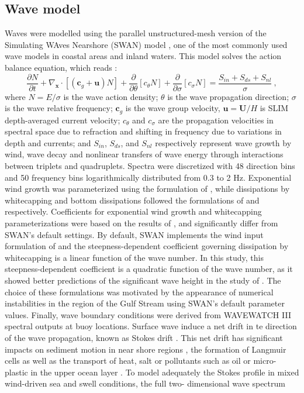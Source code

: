 \documentclass[11pt,a4paper]{article}
\begin{document}
\subsection{Wave model}
Waves were modelled using the parallel unstructured-mesh version of the Simulating WAves Nearshore (SWAN) model \citep{booij1999third}, one of the most commonly used wave models in coastal areas and inland waters. This model solves the action balance equation, which reads \citep{mei1989applied}:
\begin{equation}
    \dfrac{\partial N}{\partial t} + \nabla_\mathbf{x}\cdot[(\mathbf{c}_g+\mathbf{u})N] + \dfrac{\partial }{\partial \theta}[c_\theta N] + \dfrac{\partial}{\partial \sigma}[c_\sigma N] = \dfrac{S_{in}+S_{ds}+S_{nl}}{\sigma}~, \label{eq:swan}
\end{equation}
where $N=E/\sigma$ is the wave action density; $\theta$ is the wave propagation direction; $\sigma$ is the wave relative frequency; $\mathbf{c}_g$ is the wave group velocity, $\mathbf{u}=\mathbf{U}/H$ is SLIM depth-averaged current velocity; $c_\theta$ and $c_\sigma$ are the propagation velocities in spectral space due to refraction and shifting in frequency due to variations in depth and currents; and $S_{in}$, $S_{ds}$, and $S_{nl}$ respectively represent wave growth by wind, wave decay and nonlinear transfers of wave energy through interactions between triplets and quadruplets. Spectra were discretized with 48 direction bins and 50 frequency bins logarithmically distributed from 0.3 to 2 Hz. Exponential wind growth was parameterized using the formulation of \cite{janssen1991quasi}, while dissipations by whitecapping and bottom dissipations followed the formulations of \cite{komen1984existence} and \cite{madsen1989spectral} respectively. Coefficients for exponential wind growth and whitecapping parameterizations were based on the results of \cite{siadatmousavi2011evaluation}, and significantly differ from SWAN's default settings. By default, SWAN implements the wind input formulation of \cite{komen1984existence} and the steepness-dependent coefficient governing dissipation by whitecapping is a linear function of the wave number. In this study, this steepness-dependent coefficient is a quadratic function of the wave number, as it showed better predictions of the significant wave height in the study of \cite{siadatmousavi2011evaluation}. The choice of these formulations was motivated by the appearance of numerical instabilities in the region of the Gulf Stream using SWAN's default parameter values. Finally, wave boundary conditions were derived from WAVEWATCH III \citep{tolman2009user} spectral outputs at buoy locations. Surface wave induce a net drift in te direction of the wave propagation, known as Stokes drift \citep{van2018stokes,stokes1880theory}. This net drift has significant impacts on sediment motion in near shore regions \citep{hoefel2003wave}, the formation of Langmuir cells \citep{langmuir1938surface, craik1976rational} as well as the transport of heat, salt or pollutants such as oil or micro-plastic in the upper ocean layer \citep{mcwilliams2000vertical,rohrs2012observation,drivdal2014wave}. To model adequately the Stokes profile in mixed wind-driven sea and swell conditions, the full two- dimensional wave spectrum 
\end{document}
